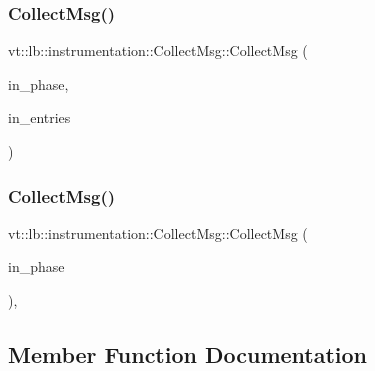 \subsubsection{\texorpdfstring{Collect\+Msg()}{CollectMsg()}\hspace{0.1cm}{\footnotesize\ttfamily [2/3]}}
{\footnotesize\ttfamily vt\+::lb\+::instrumentation\+::\+Collect\+Msg\+::\+Collect\+Msg (\begin{DoxyParamCaption}\item[{\hyperlink{namespacevt_a5505d0bab25ce2ff566a8e015871b379}{L\+B\+Phase\+Type} const \&}]{in\+\_\+phase,  }\item[{\hyperlink{namespacevt_1_1lb_af7c6ee21a7b3966b7ab64c5b626d30f8}{Proc\+Container\+Type} const \&}]{in\+\_\+entries }\end{DoxyParamCaption})\hspace{0.3cm}{\ttfamily [inline]}}

\mbox{\label{structvt_1_1lb_1_1instrumentation_1_1_collect_msg_ab7d73ed0bc6680b4c214aa2e44705d16}} 
\subsubsection{\texorpdfstring{Collect\+Msg()}{CollectMsg()}\hspace{0.1cm}{\footnotesize\ttfamily [3/3]}}
{\footnotesize\ttfamily vt\+::lb\+::instrumentation\+::\+Collect\+Msg\+::\+Collect\+Msg (\begin{DoxyParamCaption}\item[{\hyperlink{namespacevt_a5505d0bab25ce2ff566a8e015871b379}{L\+B\+Phase\+Type} const \&}]{in\+\_\+phase }\end{DoxyParamCaption})\hspace{0.3cm}{\ttfamily [inline]}, {\ttfamily [explicit]}}



\subsection{Member Function Documentation}
\mbox{\label{structvt_1_1lb_1_1instrumentation_1_1_collect_msg_a0c499ea8b5dea147b7c1808400b2c77a}} 
